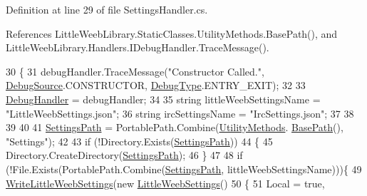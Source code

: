 Definition at line 29 of file Settings\+Handler.\+cs.



References Little\+Weeb\+Library.\+Static\+Classes.\+Utility\+Methods.\+Base\+Path(), and Little\+Weeb\+Library.\+Handlers.\+I\+Debug\+Handler.\+Trace\+Message().


\begin{DoxyCode}
30         \{
31             debugHandler.TraceMessage(\textcolor{stringliteral}{"Constructor Called."}, \mbox{\hyperlink{namespace_little_weeb_library_1_1_handlers_a2a6ca0775121c9c503d58aa254d292be}{DebugSource}}.CONSTRUCTOR, 
      \mbox{\hyperlink{namespace_little_weeb_library_1_1_handlers_ab66019ed40462876ec4e61bb3ccb0a62}{DebugType}}.ENTRY\_EXIT);
32 
33             \mbox{\hyperlink{class_little_weeb_library_1_1_handlers_1_1_settings_handler_a80da61f3a3fcbb5f9ac6057591a98acf}{DebugHandler}} = debugHandler;
34 
35             \textcolor{keywordtype}{string} littleWeebSettingsName = \textcolor{stringliteral}{"LittleWeebSettings.json"};
36             \textcolor{keywordtype}{string} ircSettingsName = \textcolor{stringliteral}{"IrcSettings.json"};
37 
38 
39 
40 
41             \mbox{\hyperlink{class_little_weeb_library_1_1_handlers_1_1_settings_handler_a2e309fc6b949f0bb7e7ace8c2017be7f}{SettingsPath}} = PortablePath.Combine(\mbox{\hyperlink{class_little_weeb_library_1_1_static_classes_1_1_utility_methods}{UtilityMethods}}.
      \mbox{\hyperlink{class_little_weeb_library_1_1_static_classes_1_1_utility_methods_a9fe4cf5d219f0453436fe9c85ad261bf}{BasePath}}(), \textcolor{stringliteral}{"Settings"});
42 
43             \textcolor{keywordflow}{if} (!Directory.Exists(\mbox{\hyperlink{class_little_weeb_library_1_1_handlers_1_1_settings_handler_a2e309fc6b949f0bb7e7ace8c2017be7f}{SettingsPath}}))
44             \{
45                 Directory.CreateDirectory(\mbox{\hyperlink{class_little_weeb_library_1_1_handlers_1_1_settings_handler_a2e309fc6b949f0bb7e7ace8c2017be7f}{SettingsPath}});
46             \}
47 
48             \textcolor{keywordflow}{if} (!File.Exists(PortablePath.Combine(\mbox{\hyperlink{class_little_weeb_library_1_1_handlers_1_1_settings_handler_a2e309fc6b949f0bb7e7ace8c2017be7f}{SettingsPath}}, littleWeebSettingsName)))\{
49                 \mbox{\hyperlink{class_little_weeb_library_1_1_handlers_1_1_settings_handler_af5a1ea4a3605d938b363e83268774d6f}{WriteLittleWeebSettings}}(\textcolor{keyword}{new} 
      \mbox{\hyperlink{class_little_weeb_library_1_1_settings_1_1_little_weeb_settings}{LittleWeebSettings}}()
50                 \{
51                     Local = \textcolor{keyword}{true},

\end{DoxyCode}
